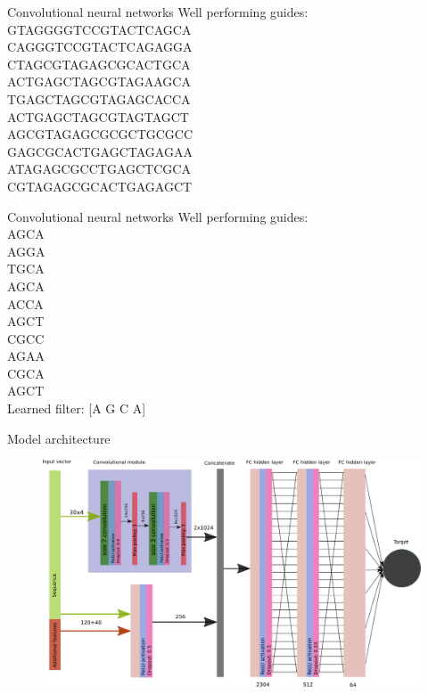 \documentclass[Nike]{tuberlinbeamer}
\begin{document}
\begin{frame}{Convolutional neural networks}
  Well performing guides: \\
  {\large
    GTAGGGGTCCGTACTCAGCA \\
    CAGGGTCCGTACTCAGAGGA \\
    CTAGCGTAGAGCGCACTGCA \\
    ACTGAGCTAGCGTAGAAGCA \\
    TGAGCTAGCGTAGAGCACCA \\
    ACTGAGCTAGCGTAGTAGCT \\
    AGCGTAGAGCGCGCTGCGCC \\
    GAGCGCACTGAGCTAGAGAA \\
    ATAGAGCGCCTGAGCTCGCA \\
    CGTAGAGCGCACTGAGAGCT \\
  }
\end{frame}

\begin{frame}{Convolutional neural networks}
  Well performing guides: \\
  {\large
    AGCA \\
    AGGA \\
    TGCA \\
    AGCA \\
    ACCA \\
    AGCT \\
    CGCC \\
    AGAA \\
    CGCA \\
    AGCT \\
  }
  \pause
  Learned filter: {[A G C A]}
\end{frame}

\begin{frame}{Model architecture}
  \begin{figure}
    \includegraphics[width=0.65\linewidth]{CNN38_layout.png}
  \end{figure}

\end{frame}
\end{document}
